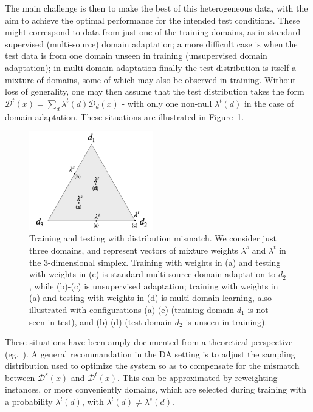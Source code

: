 \documentclass[11pt,a4paper]{article}
\begin{document}
The main challenge is then to make the best of this heterogeneous data, with the aim to achieve the optimal performance for the intended test conditions. These might correspond to data from just one of the training domains, as in standard supervised (multi-source) domain adaptation; a more difficult case is when the test data is from one domain unseen in training (unsupervised domain adaptation); in multi-domain adaptation finally the test distribution is itself a mixture of domains, some of which may also be observed in training.  Without loss of generality, one may then assume that the test distribution takes the form $\mathcal{D}^{t}(x) = \sum_d \lambda^{t}(d) \mathcal{D}_d(x)$ - with only one non-null  $\lambda^{t}(d)$ in the case of domain adaptation.
These situations are illustrated in Figure~\ref{fig:mdmt-lambdas}.
\begin{figure}[h]
  \centering
  \includegraphics[width=0.48\textwidth]{mdmt-lambdas}
  \caption{Training and testing with distribution mismatch. We consider just three domains, and represent vectors of mixture weights $\lambda^{s}$ and $\lambda^{t}$ in the 3-dimensional simplex. Training with weights in (a) and testing with weights in (c) is standard multi-source domain adaptation to $d_2$, while (b)-(c) is unsupervised adaptation; training with weights in (a) and testing with weights in (d) is multi-domain learning, also illustrated with configurations (a)-(e) (training domain $d_1$ is not seen in test), and (b)-(d)  (test domain $d_2$ is unseen in training).}\label{fig:mdmt-lambdas}
\end{figure}

These situations have been amply documented from a theoretical perspective (eg.\ \cite{Mansour09multiple,Mansour09domainadaptation,Hoffman18algorithms}). A general recommandation in the DA setting  is to adjust the sampling distribution used to optimize the system so as to compensate for the mismatch between $\mathcal{D}^s(x)$ and $\mathcal{D}^t(x)$. This can be approximated by reweighting instances, or more conveniently domains, which are selected during training with a probability $\lambda^{l}(d)$, with $\lambda^{l}(d) \neq \lambda^{s}(d)$.
\end{document}
